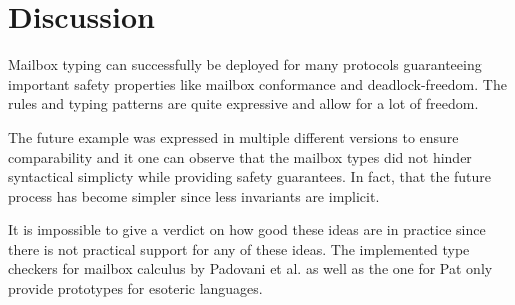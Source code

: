 
\section{Discussion}
\label{sec:discussion}

Mailbox typing can successfully be deployed for many protocols guaranteeing important safety properties like mailbox conformance and deadlock-freedom. The rules and typing patterns are quite expressive and allow for a lot of freedom. 

The future example was expressed in multiple different versions to ensure comparability and it one can observe that the mailbox types did not hinder syntactical simplicty while providing safety guarantees. In fact, that the future process has become simpler since less invariants are implicit.

It is impossible to give a verdict on how good these ideas are in practice since there is not practical support for any of these ideas. The implemented type checkers for mailbox calculus by Padovani et al.\cite{padovaniBoystrangeMCC2024} as well as the one for Pat\cite{fowlerPatCheckerGithub2025} only provide prototypes for esoteric languages. 

